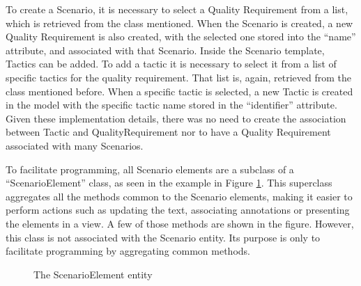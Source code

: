 To create a Scenario, it is necessary to select a Quality Requirement from a list, which is retrieved from the class mentioned. When the Scenario is created, a new Quality Requirement is also created, with the selected one stored into the ``name'' attribute, and associated with that Scenario. Inside the Scenario template, Tactics can be added. To add a tactic it is necessary to select it from a list of specific tactics for the quality requirement. That list is, again, retrieved from the class mentioned before. When a specific tactic is selected, a new Tactic is created in the model with the specific tactic name stored in the ``identifier'' attribute. Given these implementation details, there was no need to create the association between Tactic and QualityRequirement nor to have a Quality Requirement associated with many Scenarios.

To facilitate programming, all Scenario elements are a subclass of a ``ScenarioElement'' class, as seen in the example in Figure \ref{figure:modelScenarioElement}. This superclass aggregates all the methods common to the Scenario elements, making it easier to perform actions such as updating the text, associating annotations or presenting the elements in a view. A few of those methods are shown in the figure. However, this class is not associated with the Scenario entity. Its purpose is only to facilitate programming by aggregating common methods. 

\begin{figure}[h]
\centering
\renewcommand {\umltextcolor}{black}
\renewcommand {\umlfillcolor}{none}
\renewcommand {\umldrawcolor}{black}

\caption{The ScenarioElement entity}
\label{figure:modelScenarioElement}
\end{figure}

